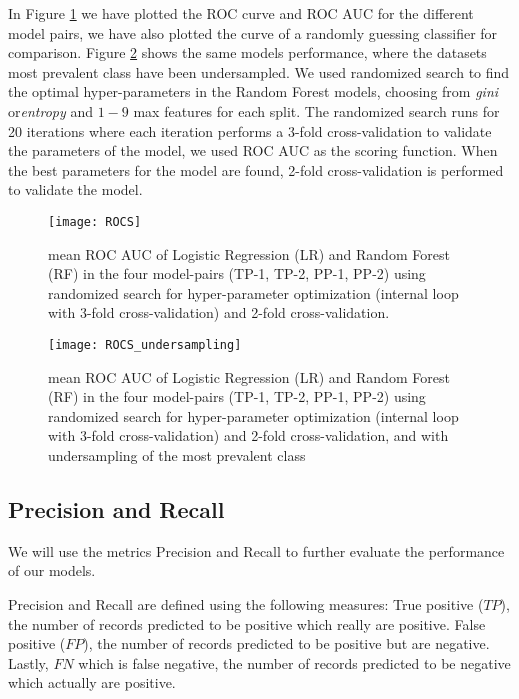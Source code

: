 In Figure \ref{fig:rocs} we have plotted the ROC curve and ROC AUC for the different model pairs, we have also plotted the curve of a randomly guessing classifier for comparison. Figure \ref{fig:rocs_undersampling} shows the same models performance, where the datasets most prevalent class have been undersampled. We used randomized search to find the optimal hyper-parameters in the Random Forest models, choosing from \textit{gini} or\textit{entropy} and $1-9$ max features for each split. The randomized search runs for 20 iterations where each iteration performs a 3-fold cross-validation to validate the parameters of the model, we used ROC AUC as the scoring function. When the best parameters for the model are found, 2-fold cross-validation is performed to validate the model.

\begin{figure}[H]
    \hspace*{-1.0cm}
    \centering
    \texttt{[image: ROCS]}
    \caption{mean ROC AUC of Logistic Regression (LR) and Random Forest (RF) in the four model-pairs (TP-1, TP-2, PP-1, PP-2) using randomized search for hyper-parameter optimization (internal loop with 3-fold cross-validation) and 2-fold cross-validation. }
    \label{fig:rocs}
\end{figure}
\begin{figure}[H]
    \hspace*{-1.0cm}
    \centering
    \texttt{[image: ROCS\_undersampling]}
    \caption{mean ROC AUC of Logistic Regression (LR) and Random Forest (RF) in the four model-pairs (TP-1, TP-2, PP-1, PP-2) using randomized search for hyper-parameter optimization (internal loop with 3-fold cross-validation) and 2-fold cross-validation, and with undersampling of the most prevalent class}
    \label{fig:rocs_undersampling}
\end{figure}

\subsection{Precision and Recall}
We will use the metrics Precision and Recall to further evaluate the performance of our models.

Precision and Recall are defined using the following measures: True positive ($TP$), the number of records predicted to be positive which really are positive. False positive ($FP$), the number of records predicted to be positive but are negative. Lastly, $FN$ which is false negative, the number of records predicted to be negative which actually are positive.

